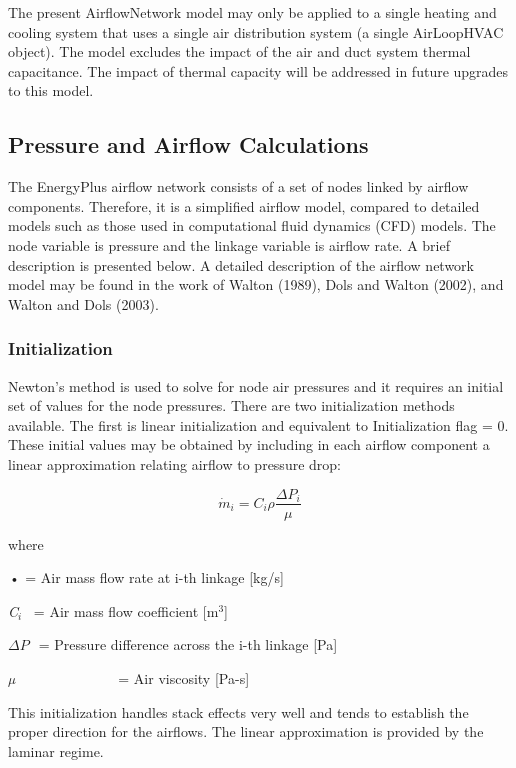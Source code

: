 The present AirflowNetwork model may only be applied to a single heating and cooling system that uses a single air distribution system (a single AirLoopHVAC object). The model excludes the impact of the air and duct system thermal capacitance. The impact of thermal capacity will be addressed in future upgrades to this model.

\subsection{Pressure and Airflow Calculations}\label{pressure-and-airflow-calculations}

The EnergyPlus airflow network consists of a set of nodes linked by airflow components. Therefore, it is a simplified airflow model, compared to detailed models such as those used in computational fluid dynamics (CFD) models. The node variable is pressure and the linkage variable is airflow rate. A brief description is presented below. A detailed description of the airflow network model may be found in the work of Walton (1989), Dols and Walton (2002), and Walton and Dols (2003).

\subsubsection{Initialization}\label{initialization}

Newton's method is used to solve for node air pressures and it requires an initial set of values for the node pressures. There are two initialization methods available. The first is linear initialization and equivalent to Initialization flag = 0. These initial values may be obtained by including in each airflow component a linear approximation relating airflow to pressure drop:

\begin{equation}
  \dot{m}_{i} = C_{i}\rho\frac{\Delta P_i}{\mu}
\end{equation}

where

\(\mathop {{m_i}}\limits^ \bullet\) = Air mass flow rate at i-th linkage {[}kg/s{]}

\emph{C\(_{i}\)}~ = Air mass flow coefficient {[}m\(^{3}\){]}

\(\Delta P\) \(_{ }\) = Pressure difference across the i-th linkage {[}Pa{]}

\emph{µ~~~}~~~~~~~~~~~ = Air viscosity {[}Pa-s{]}

This initialization handles stack effects very well and tends to establish the proper direction for the airflows. The linear approximation is provided by the laminar regime.

